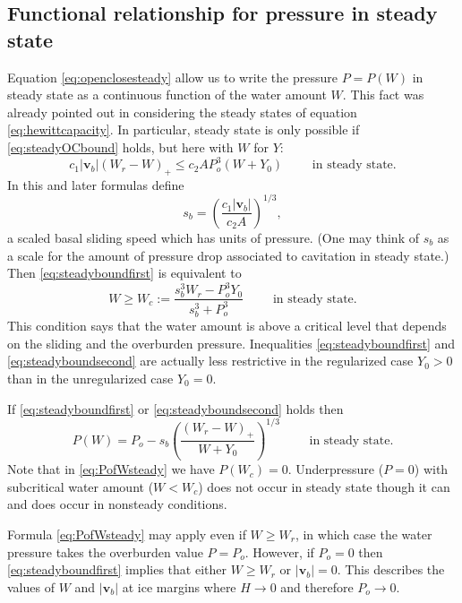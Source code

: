 \documentclass[11pt,final]{amsart}%
\newcommand\bv{\mathbf{v}}
\begin{document}
\subsection*{Functional relationship for pressure in steady state}  Equation \eqref{eq:openclosesteady} allow us to write the pressure $P=P(W)$ in steady state as a continuous function of the water amount $W$.  This fact was already pointed out in considering the steady states of equation \eqref{eq:hewittcapacity}.  In particular, steady state is only possible if \eqref{eq:steadyOCbound} holds, but here with $W$ for $Y$:
\begin{equation}
c_1 |\bv_b| (W_r - W)_+ \le c_2 A P_o^3 (W+Y_0) \qquad \text{ in steady state}. \label{eq:steadyboundfirst}
\end{equation}
In this and later formulas define
    $$s_b =  \left(\frac{c_1 |\bv_b|}{c_2 A}\right)^{1/3},$$
a scaled basal sliding speed which has units of pressure.  (One may think of $s_b$ as a scale for the amount of pressure drop associated to cavitation in steady state.)  Then \eqref{eq:steadyboundfirst} is equivalent to
\begin{equation}
W \ge W_c := \frac{s_b^3 W_r - P_o^3 Y_0}{s_b^3 + P_o^3} \qquad \text{ in steady state}. \label{eq:steadyboundsecond}
\end{equation}
This condition says that the water amount is above a critical level that depends on the sliding and the overburden pressure.  Inequalities \eqref{eq:steadyboundfirst} and \eqref{eq:steadyboundsecond} are actually less restrictive in the regularized case $Y_0>0$ than in the unregularized case $Y_0=0$.

If \eqref{eq:steadyboundfirst} or \eqref{eq:steadyboundsecond} holds then
\begin{equation}
P(W) = P_o - s_b \left(\frac{(W_r - W)_+}{W+Y_0}\right)^{1/3} \qquad \text{ in steady state}.  \label{eq:PofWsteady}
\end{equation}
Note that in \eqref{eq:PofWsteady} we have $P(W_c)=0$.  Underpressure ($P=0$) with subcritical water amount ($W<W_c$) does not occur in steady state though it can and does occur in nonsteady conditions.  

Formula \eqref{eq:PofWsteady} may apply even if $W\ge W_r$, in which case the water pressure takes the overburden value $P = P_o$.  However, if $P_o=0$ then \eqref{eq:steadyboundfirst} implies that either $W\ge W_r$ or $|\bv_b|=0$.  This describes the values of $W$ and $|\bv_b|$ at ice margins where $H\to 0$ and therefore $P_o\to 0$.
\end{document}
